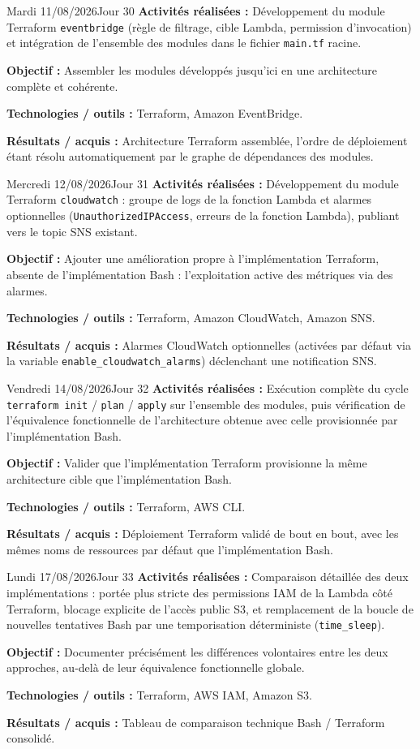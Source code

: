 \documentclass[11pt,a4paper]{article}
\newcommand{\journalfield}[2]{{\color{primaryblue}\textbf{#1 :}} #2\par\smallskip}
\begin{document}
\begin{journalday}{Mardi 11/08/2026}{Jour 30}
\journalfield{Activités réalisées}{Développement du module Terraform \texttt{eventbridge} (règle de filtrage, cible Lambda, permission d'invocation) et intégration de l'ensemble des modules dans le fichier \texttt{main.tf} racine.}
\journalfield{Objectif}{Assembler les modules développés jusqu'ici en une architecture complète et cohérente.}
\journalfield{Technologies / outils}{Terraform, Amazon EventBridge.}
\journalfield{Résultats / acquis}{Architecture Terraform assemblée, l'ordre de déploiement étant résolu automatiquement par le graphe de dépendances des modules.}
\end{journalday}

\begin{journalday}{Mercredi 12/08/2026}{Jour 31}
\journalfield{Activités réalisées}{Développement du module Terraform \texttt{cloudwatch} : groupe de logs de la fonction Lambda et alarmes optionnelles (\texttt{UnauthorizedIPAccess}, erreurs de la fonction Lambda), publiant vers le topic SNS existant.}
\journalfield{Objectif}{Ajouter une amélioration propre à l'implémentation Terraform, absente de l'implémentation Bash : l'exploitation active des métriques via des alarmes.}
\journalfield{Technologies / outils}{Terraform, Amazon CloudWatch, Amazon SNS.}
\journalfield{Résultats / acquis}{Alarmes CloudWatch optionnelles (activées par défaut via la variable \texttt{enable\_cloudwatch\_alarms}) déclenchant une notification SNS.}
\end{journalday}

\begin{journalday}{Vendredi 14/08/2026}{Jour 32}
\journalfield{Activités réalisées}{Exécution complète du cycle \texttt{terraform init} / \texttt{plan} / \texttt{apply} sur l'ensemble des modules, puis vérification de l'équivalence fonctionnelle de l'architecture obtenue avec celle provisionnée par l'implémentation Bash.}
\journalfield{Objectif}{Valider que l'implémentation Terraform provisionne la même architecture cible que l'implémentation Bash.}
\journalfield{Technologies / outils}{Terraform, AWS CLI.}
\journalfield{Résultats / acquis}{Déploiement Terraform validé de bout en bout, avec les mêmes noms de ressources par défaut que l'implémentation Bash.}
\end{journalday}

\begin{journalday}{Lundi 17/08/2026}{Jour 33}
\journalfield{Activités réalisées}{Comparaison détaillée des deux implémentations : portée plus stricte des permissions IAM de la Lambda côté Terraform, blocage explicite de l'accès public S3, et remplacement de la boucle de nouvelles tentatives Bash par une temporisation déterministe (\texttt{time\_sleep}).}
\journalfield{Objectif}{Documenter précisément les différences volontaires entre les deux approches, au-delà de leur équivalence fonctionnelle globale.}
\journalfield{Technologies / outils}{Terraform, AWS IAM, Amazon S3.}
\journalfield{Résultats / acquis}{Tableau de comparaison technique Bash / Terraform consolidé.}
\end{journalday}
\end{document}
